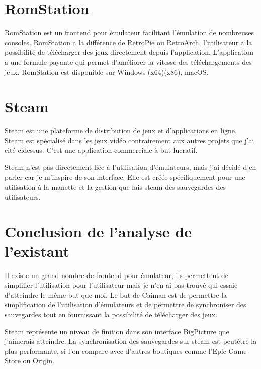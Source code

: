 \documentclass[a4paper,12pt,french]{sphinxmanual}
\begin{document}
\section{RomStation}
\label{\detokenize{opportunite:romstation}}
\sphinxAtStartPar
{}

\sphinxAtStartPar
RomStation est un frontend pour émulateur facilitant l’émulation de nombreuses consoles. RomStation a la différence de RetroPie ou RetroArch, l’utilisateur a la possibilité de  télécharger des jeux directement depuis l’application. L’application a une formule payante qui permet d’améliorer la vitesse des téléchargements des jeux. RomStation est disponible sur Windows (x64)(x86), macOS.


\section{Steam}
\label{\detokenize{opportunite:steam}}
\sphinxAtStartPar
{}

\sphinxAtStartPar
Steam est une plateforme de distribution de jeux et d’applications en ligne. Steam est spécialisé dans les jeux vidéo contrairement aux autres projets que j’ai cité ci\sphinxhyphen{}dessus. C’est une application commerciale à but lucratif.

\sphinxAtStartPar
Steam n’est pas directement liée à l’utilisation d’émulateurs, mais j’ai décidé d’en parler car je m’inspire de son interface. Elle est créée spécifiquement pour une utilisation à la manette et la gestion que fais steam dès sauvegardes des utilisateurs.


\section{Conclusion de l’analyse de l’existant}
\label{\detokenize{opportunite:conclusion-de-lanalyse-de-l-existant}}
\sphinxAtStartPar
Il existe un grand nombre de frontend pour émulateur, ils permettent de simplifier l’utilisation pour l’utilisateur mais je n’en ai pas trouvé qui essaie d’atteindre le même but que moi. Le but de Caiman est de permettre la simplification de l’utilisation d’émulateurs et de permettre de synchroniser des sauvegardes tout en fournissant la possibilité de télécharger des jeux.

\sphinxAtStartPar
Steam représente un niveau de finition dans son interface BigPicture que j’aimerais atteindre. La synchronisation des sauvegardes sur steam est peut\sphinxhyphen{}être la plus performante, si l’on compare avec d’autres boutiques comme l’Epic Game Store ou Origin.
\end{document}
